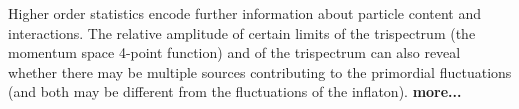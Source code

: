  
Higher order statistics encode further information about particle content and interactions. The relative amplitude of certain limits of the trispectrum (the momentum space 4-point function) and of the trispectrum can also reveal whether there may be multiple sources contributing to the primordial fluctuations (and both may be different from the fluctuations of the inflaton). {\bf more...}





